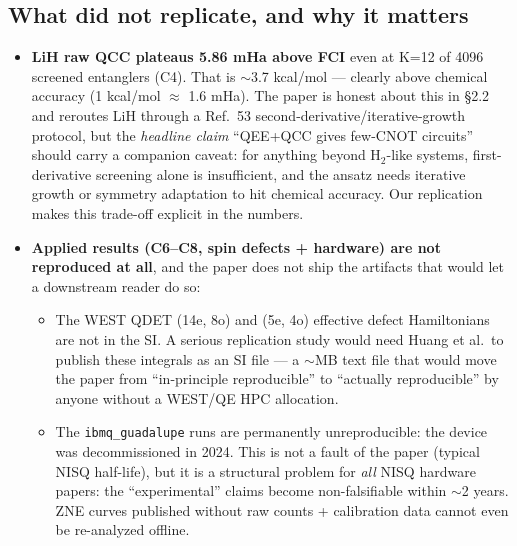\documentclass[11pt]{article}
\begin{document}
\subsection*{What did not replicate, and why it matters}
\begin{itemize}\itemsep0.1em
\item \textbf{LiH raw QCC plateaus 5.86 mHa above FCI} even at K=12 of 4096 screened entanglers (C4). That is $\sim$3.7 kcal/mol --- clearly above chemical accuracy (1 kcal/mol $\approx$ 1.6 mHa). The paper is honest about this in \S2.2 and reroutes LiH through a Ref.\ 53 second-derivative/iterative-growth protocol, but the \emph{headline claim} ``QEE+QCC gives few-CNOT circuits'' should carry a companion caveat: for anything beyond H$_2$-like systems, first-derivative screening alone is insufficient, and the ansatz needs iterative growth or symmetry adaptation to hit chemical accuracy. Our replication makes this trade-off explicit in the numbers.
\item \textbf{Applied results (C6--C8, spin defects + hardware) are not reproduced at all}, and the paper does not ship the artifacts that would let a downstream reader do so:
  \begin{itemize}
  \item The WEST QDET (14e, 8o) and (5e, 4o) effective defect Hamiltonians are not in the SI. A serious replication study would need Huang et al.\ to publish these integrals as an SI file --- a $\sim$MB text file that would move the paper from ``in-principle reproducible'' to ``actually reproducible'' by anyone without a WEST/QE HPC allocation.
  \item The \texttt{ibmq\_guadalupe} runs are permanently unreproducible: the device was decommissioned in 2024. This is not a fault of the paper (typical NISQ half-life), but it is a structural problem for \emph{all} NISQ hardware papers: the ``experimental'' claims become non-falsifiable within $\sim$2 years. ZNE curves published without raw counts + calibration data cannot even be re-analyzed offline.
  \end{itemize}
\end{itemize}
\end{document}
